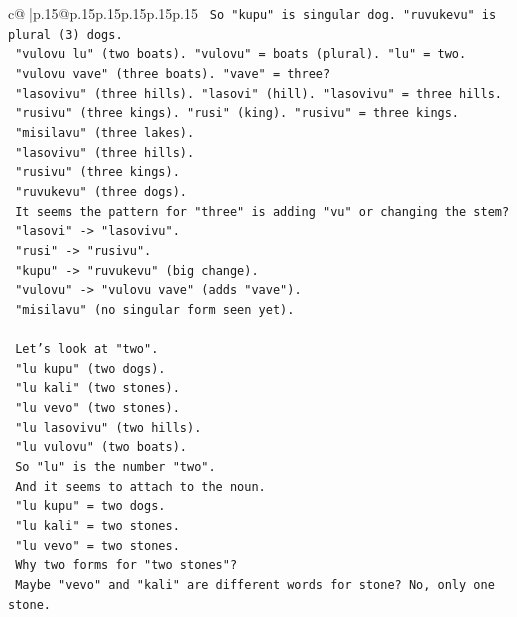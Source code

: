 \documentclass{article}
\begin{document}
{\begin{supertabular}{c@{$\;$}|p{.15\linewidth}@{}p{.15\linewidth}p{.15\linewidth}p{.15\linewidth}p{.15\linewidth}p{.15\linewidth}}
{{{\texttt{   So "kupu" is singular dog. "ruvukevu" is plural (3) dogs.} \\
\texttt{   "vulovu lu" (two boats). "vulovu" = boats (plural). "lu" = two.} \\
\texttt{   "vulovu vave" (three boats). "vave" = three?} \\
\texttt{   "lasovivu" (three hills). "lasovi" (hill). "lasovivu" = three hills.} \\
\texttt{   "rusivu" (three kings). "rusi" (king). "rusivu" = three kings.} \\
\texttt{   "misilavu" (three lakes).} \\
\texttt{   "lasovivu" (three hills).} \\
\texttt{   "rusivu" (three kings).} \\
\texttt{   "ruvukevu" (three dogs).} \\
\texttt{   It seems the pattern for "three" is adding "vu" or changing the stem?} \\
\texttt{   "lasovi" {-}> "lasovivu".} \\
\texttt{   "rusi" {-}> "rusivu".} \\
\texttt{   "kupu" {-}> "ruvukevu" (big change).} \\
\texttt{   "vulovu" {-}> "vulovu vave" (adds "vave").} \\
\texttt{   "misilavu" (no singular form seen yet).} \\
\\ 
\texttt{   Let's look at "two".} \\
\texttt{   "lu kupu" (two dogs).} \\
\texttt{   "lu kali" (two stones).} \\
\texttt{   "lu vevo" (two stones).} \\
\texttt{   "lu lasovivu" (two hills).} \\
\texttt{   "lu vulovu" (two boats).} \\
\texttt{   So "lu" is the number "two".} \\
\texttt{   And it seems to attach to the noun.} \\
\texttt{   "lu kupu" = two dogs.} \\
\texttt{   "lu kali" = two stones.} \\
\texttt{   "lu vevo" = two stones.} \\
\texttt{   Why two forms for "two stones"?} \\
\texttt{   Maybe "vevo" and "kali" are different words for stone? No, only one stone.} \\
}}}
\end{supertabular}}
\end{document}
